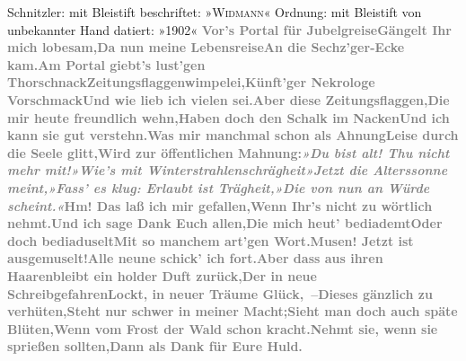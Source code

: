 {\newline{}Schnitzler: mit Bleistift beschriftet: »\textsc{Widmann}« \newline{}Ordnung: mit Bleistift von unbekannter Hand datiert: »1902« }\toendnotes[C]{\smallbreak}\stanza{}{\pb}\textcolor{gray}{\textbf{Vor’s Portal für Jubelgreise}}\newverse{}\textcolor{gray}{\textbf{Gängelt Ihr mich lobesam,}}\newverse{}\textcolor{gray}{\textbf{Da nun meine Lebensreise}}\newverse{}\textcolor{gray}{\textbf{An die Sechz’ger-Ecke kam.}}\stanzaend{}\stanza{}\textcolor{gray}{\textbf{Am Portal giebt’s lust’gen Thorschnack}}\newverse{}\textcolor{gray}{\textbf{Zeitungsflaggenwimpelei,}}\newverse{}\textcolor{gray}{\textbf{Künft’ger Nekrologe Vorschmack}}\newverse{}\textcolor{gray}{\textbf{Und wie lieb ich vielen sei.}}\stanzaend{}\stanza{}\textcolor{gray}{\textbf{Aber diese Zeitungsflaggen,}}\newverse{}\textcolor{gray}{\textbf{Die mir heute freundlich wehn,}}\newverse{}\textcolor{gray}{\textbf{Haben doch den Schalk im Nacken}}\newverse{}\textcolor{gray}{\textbf{Und ich kann sie gut verstehn.}}\stanzaend{}\stanza{}\textcolor{gray}{\textbf{Was mir manchmal schon als Ahnung}}\newverse{}\textcolor{gray}{\textbf{Leise durch die Seele glitt,}}\newverse{}\textcolor{gray}{\textbf{Wird zur öffentlichen Mahnung:}}\newverse{}\textcolor{gray}{\textbf{\emph{»Du bist alt! Thu nicht mehr mit!}}}\stanzaend{}\stanza{}\textcolor{gray}{\textbf{\emph{»Wie’s mit Winterstrahlenschrägheit}}}\newverse{}\textcolor{gray}{\textbf{\emph{»Jetzt die Alterssonne meint,}}}\newverse{}\textcolor{gray}{\textbf{\emph{»Fass’ es klug: Erlaubt ist Trägheit,}}}\newverse{}\textcolor{gray}{\textbf{\emph{»Die von nun an Würde scheint.«}}}\stanzaend{}\stanza{}{\pb}\textcolor{gray}{\textbf{Hm! Das laß ich mir gefallen,}}\newverse{}\textcolor{gray}{\textbf{Wenn Ihr’s nicht zu wörtlich nehmt.}}\newverse{}\textcolor{gray}{\textbf{Und ich sage Dank Euch allen,}}\newverse{}\textcolor{gray}{\textbf{Die mich heut’ bediademt}}\stanzaend{}\stanza{}\textcolor{gray}{\textbf{Oder doch bediaduselt}}\newverse{}\textcolor{gray}{\textbf{Mit so manchem art’gen Wort.}}\newverse{}\textcolor{gray}{\textbf{Musen! Jetzt ist ausgemuselt!}}\newverse{}\textcolor{gray}{\textbf{Alle neune schick’ ich fort.}}\stanzaend{}\stanza{}\textcolor{gray}{\textbf{Aber dass aus ihren Haaren}}\newverse{}\textcolor{gray}{\textbf{bleibt ein holder Duft zurück,}}\newverse{}\textcolor{gray}{\textbf{Der in neue Schreibgefahren}}\newverse{}\textcolor{gray}{\textbf{Lockt, in neuer Träume Glück, –}}\stanzaend{}\stanza{}\textcolor{gray}{\textbf{Dieses gänzlich zu verhüten,}}\newverse{}\textcolor{gray}{\textbf{Steht nur schwer in meiner Macht;}}\newverse{}\textcolor{gray}{\textbf{Sieht man doch auch späte Blüten,}}\newverse{}\textcolor{gray}{\textbf{Wenn vom Frost der Wald schon kracht.}}\stanzaend{}\stanza{}\textcolor{gray}{\textbf{Nehmt sie, wenn sie sprießen sollten,}}\newverse{}\textcolor{gray}{\textbf{Dann als Dank für Eure Huld.}}\newverse{}\textcolor{gray}{\textbf{}}\newverse{}\textcolor{gray}{\textbf{}}\stanzaend{}\pstart
